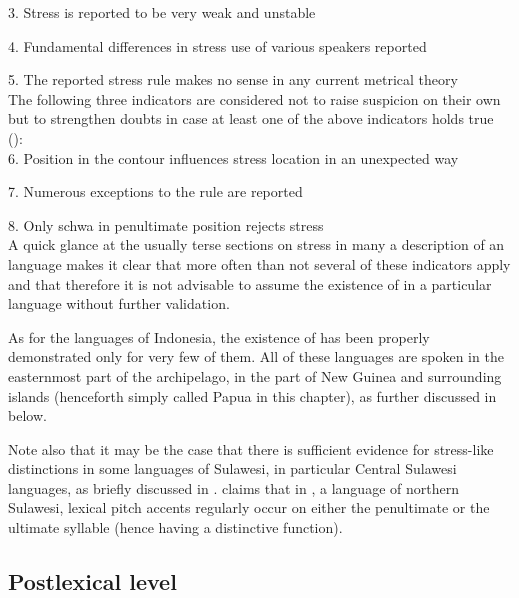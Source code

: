 \documentclass[output=paper
,modfonts
,nonflat]{langsci/langscibook}
\begin{document}
3. Stress is reported to be very weak and unstable

4. Fundamental differences in stress use of various speakers reported

5. The reported stress rule makes no sense in any current metrical theory\\

\noindent
The following three indicators are considered not to raise suspicion on their own but to strengthen doubts in case at least one of the above indicators holds true (\citealt[88]{Goedemans2014}): \\

6. Position in the  contour influences stress location in an unexpected way

7. Numerous exceptions to the rule are reported

8. Only schwa in penultimate position rejects stress\\

\noindent
A quick glance at the usually terse sections on stress in many a description of an  language makes it clear that more often than not several of these indicators apply and that therefore it is not advisable to assume the existence of  in a particular  language without further validation. 

As for the  languages of Indonesia, the existence of  has been properly demonstrated only for very few of them. All of these languages are spoken in the easternmost part of the archipelago, in the  part of New Guinea and surrounding islands (henceforth simply called Papua in this chapter), as further discussed in  below. 

Note also that it may be the case that there is sufficient evidence for stress-like distinctions in some languages of Sulawesi, in particular Central Sulawesi languages, as briefly discussed in \citet{Himmelmann2018a}. \citet{Utsumi2011} claims that in , a  language of northern Sulawesi, lexical pitch accents regularly occur on either the penultimate or the ultimate syllable (hence having a distinctive function).

\subsection{\label{s:himmelmann:3.2}Postlexical level} 
\end{document}
